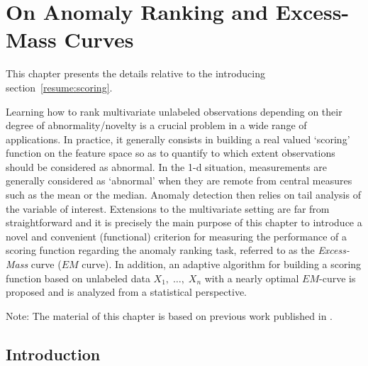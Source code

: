 \chapter{On Anomaly Ranking and Excess-Mass Curves}
\label{aistat:chap}
\begin{chapabstract}
This chapter presents the details relative to the introducing section~\ref{resume:scoring}.

Learning how to rank multivariate unlabeled observations depending on their degree of abnormality/novelty is a crucial problem in a wide range of applications. In practice, it generally consists in building a real valued `scoring' function on the feature space
so as to quantify to which extent observations should be considered as abnormal.
 In the 1-d situation, measurements are generally considered as `abnormal' when they are remote from central measures such as the mean or the median. Anomaly detection then relies on tail
analysis of the variable of interest. Extensions to the multivariate setting are far from straightforward and it is precisely the main purpose of this chapter to introduce a novel and convenient (functional) criterion for measuring the performance of a scoring function regarding the anomaly ranking task, referred to as the \textit{Excess-Mass} curve ($EM$
curve). In addition, an adaptive algorithm for building a scoring function based on unlabeled data $X_1,\; \ldots,\; X_n$ with a nearly optimal $EM$-curve is proposed and is analyzed from a statistical perspective.
\end{chapabstract}
Note: The material of this chapter is based on previous work published in \cite{AISTAT15}.



\section{Introduction}

